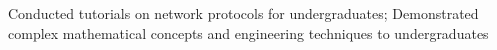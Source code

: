 \documentclass[8pt,a4paper,ragged2e,withhyper]{altacv}
\begin{document}





Conducted tutorials on network protocols for undergraduates; Demonstrated complex mathematical concepts and engineering techniques to undergraduates
\smallskip
\end{document}
